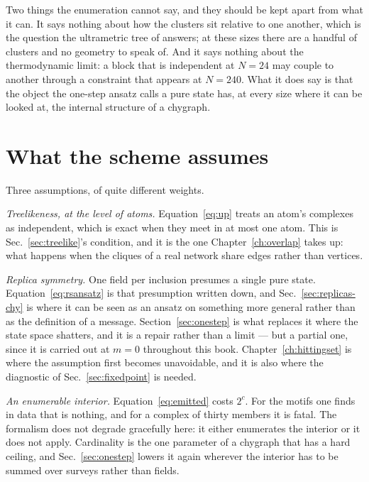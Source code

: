 Two things the enumeration cannot say, and they should be kept apart from
what it can. It says nothing about how the clusters sit relative to one
another, which is the question the ultrametric tree of \citet{mezard1987}
answers; at these sizes there are a handful of clusters and no geometry to
speak of. And it says nothing about the thermodynamic limit: a block that is
independent at $N=24$ may couple to another through a constraint that
appears at $N=240$. What it does say is that the object the one-step ansatz
calls a pure state has, at every size where it can be looked at, the
internal structure of a chygraph.

\section{What the scheme assumes}
\label{sec:assumes}

Three assumptions, of quite different weights.

\emph{Treelikeness, at the level of atoms.} Equation~\eqref{eq:up} treats an
atom's complexes as independent, which is exact when they meet in at most one
atom. This is Sec.~\ref{sec:treelike}'s condition, and it is the one
Chapter~\ref{ch:overlap} takes up: what happens when the cliques of a real
network share edges rather than vertices.

\emph{Replica symmetry.} One field per inclusion presumes a single pure state.
Equation~\eqref{eq:rsansatz} is that presumption written down, and
Sec.~\ref{sec:replicas-chy} is where it can be seen as an ansatz on something
more general rather than as the definition of a message.
Section~\ref{sec:onestep} is what replaces it where the state space shatters,
and it is a repair rather than a limit --- but a partial one, since it is
carried out at $m=0$ throughout this book.
Chapter~\ref{ch:hittingset} is where the assumption first becomes unavoidable,
and it is also where the diagnostic of Sec.~\ref{sec:fixedpoint} is needed.

\emph{An enumerable interior.} Equation~\eqref{eq:emitted} costs $2^{c}$. For
the motifs one finds in data that is nothing, and for a complex of thirty
members it is fatal. The formalism does not degrade gracefully here: it either
enumerates the interior or it does not apply. Cardinality is the one parameter
of a chygraph that has a hard ceiling, and Sec.~\ref{sec:onestep} lowers it
again wherever the interior has to be summed over surveys rather than fields.


